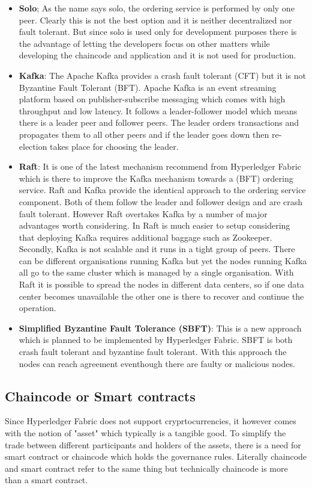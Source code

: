 \begin{itemize}
  \item \textbf{Solo};  As the name says solo, the ordering service is performed by only one peer. Clearly this is not the best option and it is neither decentralized  nor fault tolerant. But since solo is used only for development purposes there is the advantage of letting the developers focus on other matters while developing the chaincode and application and it is not used for production. 
 \item \textbf{Kafka}: The Apache Kafka provides a crash fault tolerant (CFT) but it is not Byzantine Fault Tolerant (BFT). Apache Kafka is an event streaming platform based on publisher-subscribe messaging which comes with high throughput and low latency. It follows a leader-follower model which means there is a leader peer and follower peers. The leader orders transactions and propagates them to all other peers and if the leader goes down then re-election takes place for choosing the leader. 
 \item \textbf{Raft}: It is one of the latest mechanism recommend from Hyperledger Fabric which is there to improve the Kafka mechanism towards a (BFT) ordering service. Raft and Kafka provide the identical approach to the ordering service component. Both of them follow the leader and follower design and are crash fault tolerant. However Raft overtakes Kafka by a number of major advantages worth considering. In Raft is much easier to setup considering that deploying Kafka requires additional baggage such as Zookeeper. Secondly, Kafka is not scalable and it runs in a tight group of peers. There can be different organisations running Kafka but yet the nodes running Kafka all go to the same cluster which is managed by a single organisation. With Raft it is possible to spread the nodes in different data centers, so if one data center becomes unavailable the other one is there to recover and continue the operation.

 
 \item \textbf{Simplified Byzantine Fault Tolerance (SBFT)}: This is a new approach which is planned to be implemented by Hyperledger Fabric. SBFT is both crash fault tolerant and byzantine fault tolerant. With this approach the nodes can reach agreement eventhough there are faulty or malicious nodes. 
\end{itemize}

\subsection{Chaincode or Smart contracts}
Since Hyperledger Fabric does not support cryprtocurrencies, it however comes with the notion of "asset" which typically is a tangible good. To simplify the trade between different participants and holders of the assets, there is a need for smart contract or chaincode which holds the governance rules. Literally chaincode and smart contract refer to the same thing but technically chaincode is more than a smart contract. 


